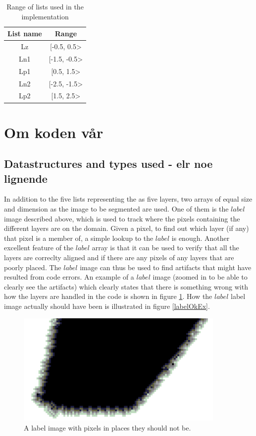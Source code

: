 \begin{table}[h] %
	\begin{tabular}{| c | c |} 
	\hline
	List name & Range\\
	\hline
	Lz & [-0.5, 0.5>\\
	Ln1 & [-1.5, -0.5>\\
	Lp1 & [0.5, 1.5>\\
	Ln2 & [-2.5, -1.5>\\
	Lp2 & [1.5, 2.5>\\
	\hline
	\end{tabular}
	\caption{Range of lists used in the implementation}
	\label{rangeTab2}
\end{table}

\section{Om koden vår}
\subsection{Datastructures and types used - elr noe lignende}
In addition to the five lists representing the as five layers, two arrays of equal size and dimension as the image to be segmented are used. One of them is the $label$ image described above, which is used to track where the pixels containing the different layers are on the domain. Given a pixel, to find out which layer (if any) that pixel is a member of, a simple lookup to the $label$ is enough. Another excellent feature of the $label$ array is that it can be used to verify that all the layers are correclty aligned and if there are any pixels of any layers that are poorly placed. The $label$ image can thus be used to find artifacts that might have resulted from code errors. An example of a $label$ image (zoomed in to be able to clearly see the artifacts) which clearly states that there is something wrong with how the layers are handled in the code is shown in figure \ref{labelFailedEx}. How the $label$ label image actually should have been is illustrated in figure \ref{labelOkEx}.

\begin{figure}[h!]
\centering
\includegraphics[width=0.90\textwidth]{implemented/labelFailedEx}
\caption{A label image with pixels in places they should not be.}
\label{labelFailedEx}
\end{figure}

